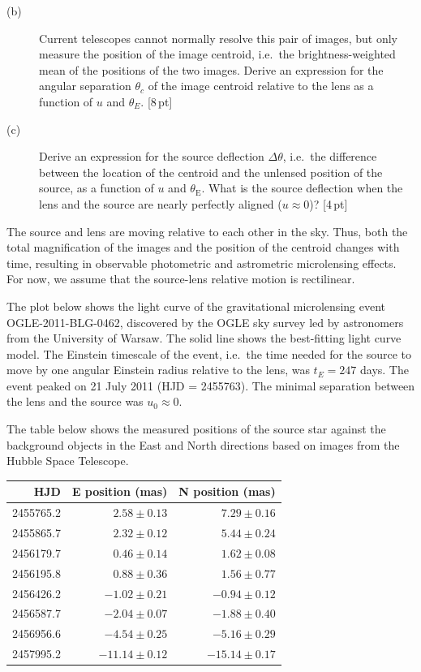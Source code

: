 
\begin{description}
\item[(b)] Current telescopes cannot normally resolve this pair of images, but
  only measure the position of the image centroid, i.e.\ the
  brightness-weighted mean of the positions of the two images. Derive an
  expression for the angular separation $\theta_c$ of the image centroid
  relative to the lens as a function of $u$ and $\theta_E$. \hfill[8\,pt]
\item[(c)] Derive an expression for the source deflection $\Delta\theta$,
  i.e.\ the difference between the location of the centroid and the unlensed
  position of the source, as a function of $u$ and $\theta_{\mathrm{E}}$. What
  is the source deflection when the lens and the source are nearly perfectly
  aligned ($u \approx 0$)? \hfill[4\,pt]
\end{description}

The source and lens are moving relative to each other in the sky. Thus, both
the total magnification of the images and the position of the centroid changes
with time, resulting in observable photometric and astrometric microlensing
effects. For now, we assume that the source-lens relative motion is
rectilinear.

The plot below shows the light curve of the gravitational microlensing event
OGLE-2011-BLG-0462, discovered by the OGLE sky survey led by astronomers from
the University of Warsaw. The solid line shows the best-fitting light curve
model. The Einstein timescale of the event, i.e.\ the time needed for the
source to move by one angular Einstein radius relative to the lens, was
$t_E = 247$ days. The event peaked on 21 July 2011 (HJD = 2455763). The
minimal separation between the lens and the source was $u_0 \approx 0$.


The table below shows the measured positions of the source star against the
background objects in the East and North directions based on images from the
Hubble Space Telescope.

\begin{center}
\begin{tabular}{rrr}
\toprule
HJD & E position (mas) & N position (mas) \\
\midrule
2455765.2 & $2.58 \pm 0.13$ & $7.29 \pm 0.16$ \\
2455865.7 & $2.32 \pm 0.12$ & $5.44 \pm 0.24$ \\
2456179.7 & $0.46 \pm 0.14$ & $1.62 \pm 0.08$ \\
2456195.8 & $0.88 \pm 0.36$ & $1.56 \pm 0.77$ \\
2456426.2 & $-1.02 \pm 0.21$ & $-0.94 \pm 0.12$ \\
2456587.7 & $-2.04 \pm 0.07$ & $-1.88 \pm 0.40$ \\
2456956.6 & $-4.54 \pm 0.25$ & $-5.16 \pm 0.29$ \\
2457995.2 & $-11.14 \pm 0.12$ & $-15.14 \pm 0.17$ \\
\bottomrule
\end{tabular}
\end{center}

